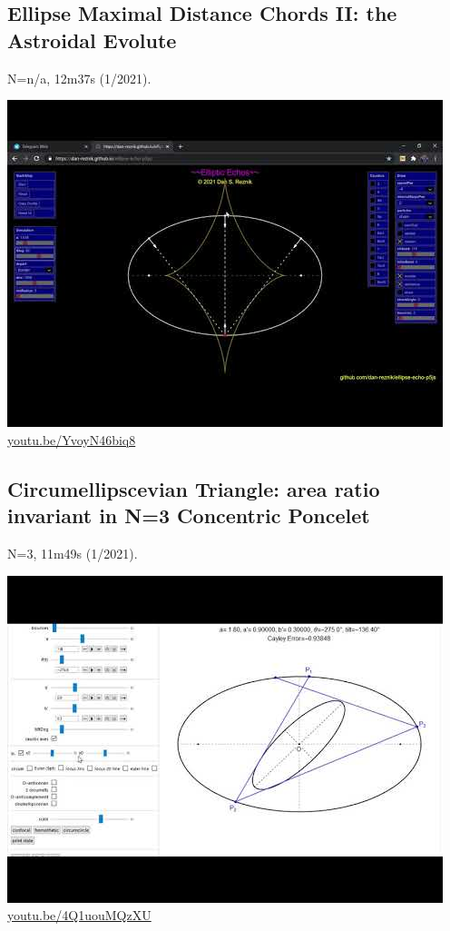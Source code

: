 \documentclass[12pt]{amsart}
\begin{document}
\subsection{Ellipse Maximal Distance Chords II: the Astroidal Evolute}
\label{vid:YvoyN46biq8}
\noindent N=n/a, 12m37s (1/2021). 
\begin{center}\includegraphics[width=.5\textwidth]{pics/YvoyN46biq8.jpg} \\ 
\href{https://youtu.be/YvoyN46biq8}{\url{youtu.be/YvoyN46biq8}}\end{center}
% 

\subsection{Circumellipscevian Triangle: area ratio invariant in N=3 Concentric Poncelet}
\label{vid:4Q1uouMQzXU}
\noindent N=3, 11m49s (1/2021). 
\begin{center}\includegraphics[width=.5\textwidth]{pics/4Q1uouMQzXU.jpg} \\ 
\href{https://youtu.be/4Q1uouMQzXU}{\url{youtu.be/4Q1uouMQzXU}}\end{center}
% 
\end{document}
